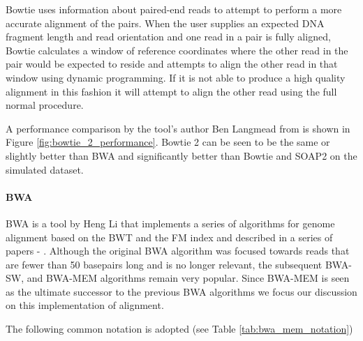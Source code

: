 Bowtie uses information about paired-end reads to attempt to perform a more accurate alignment of the pairs. When the user supplies an expected DNA fragment length and read orientation and one read in a pair is fully aligned, Bowtie calculates a window of reference coordinates where the other read in the pair would be expected to reside and attempts to align the other read in that window using dynamic programming. If it is not able to produce a high quality alignment in this fashion it will attempt to align the other read using the full normal procedure. 

A performance comparison by the tool's author Ben Langmead from \autocite{langmead2012fast} is shown in Figure \ref{fig:bowtie_2_performance}. Bowtie 2 can be seen to be the same or slightly better than BWA and significantly better than Bowtie and SOAP2 on the simulated dataset.

\paragraph{BWA}

BWA is a tool by Heng Li that implements a series of algorithms for genome alignment based on the BWT and the FM index and described in a series of papers - \autocites{li2009fast}{li2010fast}{li2013aligning}. Although the original BWA algorithm was focused towards reads that are fewer than 50 basepairs long and is no longer relevant, the subsequent BWA-SW, and BWA-MEM algorithms remain very popular. Since BWA-MEM is seen as the ultimate successor to the previous BWA algorithms we focus our discussion on this implementation of alignment. 

\clearpage 

The following common notation is adopted (see Table \ref{tab:bwa_mem_notation})

